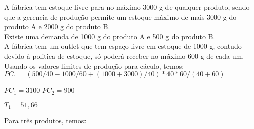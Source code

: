 \documentclass{book}
\begin{document}
A fábrica tem estoque livre para no máximo 3000 g de qualquer produto, sendo que a gerencia de produção permite um estoque máximo de mais 3000 g do produto A e 2000 g do produto B. \\

Existe uma demanda de 1000 g do produto A e 500 g do produto B. \\

A fábrica tem um outlet que tem espaço livre em estoque de 1000 g, contudo devido à politica de estoque, só poderá receber no máximo 600 g de cada um. \\

Usando os valores limites de produção para cáculo, temos: \\

$PC_1 = (500/40 - 1000/60 + (1000 + 3000)/40) * 40*60/(40+60)$

$PC_1 = 3100$
$PC_2 = 900$

$T_1 = 51,66$

Para três produtos, temos:



%
%




\end{document}
